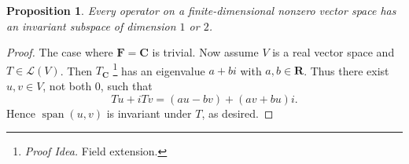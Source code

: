 \documentclass[nofonts,colorlinks]{tufte-handout}
\theoremstyle{plain} %
\newtheorem{prop}[thm]{Proposition}
\theoremstyle{definition}
\theoremstyle{remark}
\def\idea{\textit{\color[rgb]{0,0,.55}Proof Idea. }}
\newcommand{\R}{\mathbf{R}}
\newcommand{\C}{\mathbf{C}}
\newcommand{\F}{\mathbf{F}}
\renewcommand{\L}{\mathcal{L}}
\DeclareMathOperator{\spn}{span}
\begin{document}
\begin{prop}
	Every operator on a finite-dimensional nonzero vector space has an invariant subspace of dimension $1$ or $2$.
\end{prop}
\begin{proof}
	The case where $\F=\C$ is trivial. Now assume $V$ is a real vector space and $T\in\L(V)$. Then $T_{\C}$%
	\footnote{\idea Field extension.}
	has an eigenvalue $a+bi$ with $a,b\in\R$. Thus there exist $u,v\in V$, not both $0$, such that
	\[Tu+iTv=(au-bv)+(av+bu)i.\]
	Hence $\spn(u,v)$ is invariant under $T$, as desired.
\end{proof}
\end{document}

